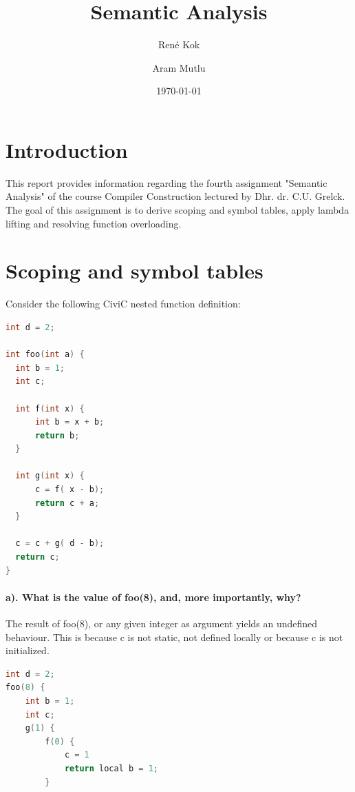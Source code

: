 \documentclass[hidelinks]{uva-inf-article}
\title{Semantic Analysis}
\author{René Kok}
\author{Aram Mutlu}
\date{\today}
\begin{document}
\maketitle


\section{Introduction}
\begin{flushleft}
\par This report provides information regarding the fourth assignment 
   "Semantic Analysis" of the course Compiler Construction lectured by Dhr. dr. C.U. Grelck. 
   The goal of this assignment is to derive scoping and symbol tables, apply lambda lifting and 
   resolving function overloading.
\newpage
\section{Scoping and symbol tables}
Consider the following CiviC nested function definition:
\begin{lstlisting}[basicstyle=\small, language=C, label=lst:code, caption=CiviC nested function definition, captionpos=b]
int d = 2;

int foo(int a) {
  int b = 1; 
  int c;

  int f(int x) { 
      int b = x + b;
      return b; 
  }

  int g(int x) { 
      c = f( x - b); 
      return c + a;
  }
    
  c = c + g( d - b); 
  return c;
}
\end{lstlisting}
\paragraph{a). What is the value of foo(8), and, more importantly, why?\\}
The result of foo(8), or any given integer as argument yields an undefined behaviour.
This is because c is not static, not defined locally or because c is not initialized.

\begin{lstlisting}[basicstyle=\small, language=C, label=lst:foo8, caption=Execution steps of running foo(8), captionpos=b]
int d = 2;
foo(8) {
    int b = 1;
    int c;
    g(1) {
        f(0) {
            c = 1
            return local b = 1;
        }


\end{lstlisting}
\end{flushleft}
\end{document}

